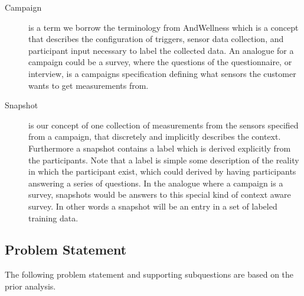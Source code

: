 \begin{description}
    \item[Campaign] is a term we borrow the terminology from AndWellness \parencite{hicks2010andwellness} which is a concept that describes  the configuration of triggers, sensor data collection, and participant input necessary to label the collected data. An analogue for a campaign could be a survey, where the questions of the questionnaire, or interview, is a campaigns specification defining what sensors the customer wants to get measurements from. 
\end{description}

\begin{description}
    \item[Snapshot] is our concept of one collection of measurements from the sensors specified from a campaign, that discretely and implicitly describes the context. Furthermore a snapshot contains a label which is derived explicitly from the participants. Note that a label is simple some description of the reality in which the participant exist, which could derived by having participants answering a series of questions. In the analogue where a campaign is a survey, snapshots would be answers to this special kind of context aware survey. In other words a snapshot will be an entry in a set of labeled training data.
\end{description}

\subsection{Problem Statement}
\label{sub:problem_statement}
The following problem statement and supporting subquestions are based on the prior analysis.




